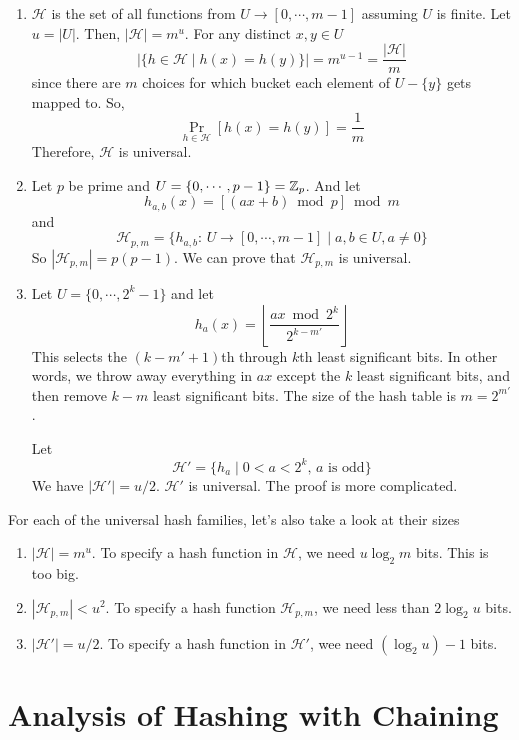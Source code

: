 \begin{enumerate}
    \item $\mathcal{H}$ is the set of all functions from $U \to [0,\cdots,m-1]$ assuming $U$ is finite. Let $u = |U|$. Then, $|\mathcal{H}|=m^u$. For any distinct $x,y\in U$
    $$
    \left| \{ h \in \mathcal{H} \mid h(x) = h(y) \} \right| = m^{u-1} = \frac{|\mathcal{H}|}{m}
    $$
    since there are $m$ choices for which bucket each element of $U - \{y\}$ gets mapped to. So,
    $$
    \Pr_{h \in \mathcal{H}} [h(x) = h(y)] = \frac{1}{m}
    $$
    Therefore, $\mathcal{H}$ is universal.

    \item Let $p$ be prime and $U = \{0,\cdots,p-1\} = \mathbb{Z}_p$. And let
    $$
    h_{a,b}(x) = [(ax+b) \bmod p] \bmod m
    $$
    and
    $$
    \mathcal{H}_{p,m} = \{h_{a,b}:\, U \to [0,\cdots,m-1] \mid a,b \in U, a \neq 0 \}
    $$
    So $|\mathcal{H}_{p,m}| = p(p-1)$. We can prove that $\mathcal{H}_{p,m}$ is universal.

    \item Let $U = \{0, \cdots, 2^k-1\}$ and let
    $$
    h_a(x) = \left\lfloor \frac{ax \bmod 2^k}{2^{k-m'}} \right\rfloor
    $$
    This selects the $(k-m'+1)$th through $k$th least significant bits. In other words, we throw away everything in $ax$ except the $k$ least significant bits, and then remove $k-m$ least significant bits. The size of the hash table is $m=2^{m'}$.
    
    Let
    $$
    \mathcal{H}' = \{ h_a \mid 0 < a < 2^k,\, \text{$a$ is odd}\}
    $$
    We have $|\mathcal{H}'| = u/2$. $\mathcal{H}'$ is universal. The proof is more complicated.
\end{enumerate}

For each of the universal hash families, let's also take a look at their sizes
\begin{enumerate}
    \item $|\mathcal{H}| = m^u$. To specify a hash function in $\mathcal{H}$, we need $u\log_2 m$ bits. This is too big.
    \item $|\mathcal{H}_{p,m}| < u^2$. To specify a hash function $\mathcal{H}_{p,m}$, we need less than $2 \log_2 u$ bits.
    \item $|\mathcal{H}'| = u / 2$. To specify a hash function in $\mathcal{H'}$, wee need $(\log_2 u) - 1$ bits.
\end{enumerate}

\section{Analysis of Hashing with Chaining}


